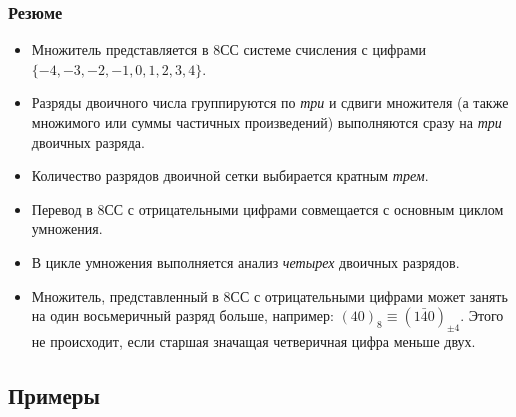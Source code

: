 \begin{frame}
    \frametitle{Резюме}

    \begin{itemize}
        \item Множитель представляется в 8СС системе счисления с цифрами $\{-4,-3,-2,-1,0,1,2,3,4\}$.
        
        \item Разряды двоичного числа группируются по \emph{три} и сдвиги множителя (а также множимого или суммы частичных произведений) выполняются сразу на \emph{три} двоичных разряда. 
    
        \item Количество разрядов двоичной сетки выбирается кратным \emph{трем}.
    
        \item Перевод в 8СС с отрицательными цифрами совмещается с основным циклом умножения.
        
        \item В цикле умножения выполняется анализ \emph{четырех} двоичных разрядов.
        
        \item Множитель, представленный в 8СС с отрицательными цифрами может занять на один восьмеричный разряд больше, например: $(40)_8\equiv(1\bar{4}0)_{\pm 4}$. Этого не происходит, если старшая значащая четверичная цифра меньше двух.
    \end{itemize}    
\end{frame}


\subsection{Примеры}


